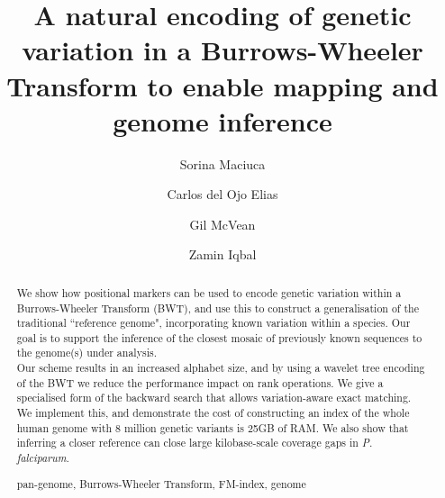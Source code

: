 \documentclass[runningheads,a4paper]{llncs}
\newcommand{\keywords}[1]{\par\addvspace\baselineskip
\noindent\keywordname\enspace\ignorespaces#1}
\begin{document}
\mainmatter  %

\title{A natural encoding of genetic variation in a Burrows-Wheeler Transform  to enable mapping and genome inference}


%
%
\author{Sorina Maciuca%
\and Carlos del Ojo Elias\and Gil McVean \and Zamin Iqbal}
%



\maketitle


\begin{abstract}
We show how positional markers can be used to encode genetic variation within a Burrows-Wheeler Transform (BWT), and use this to construct a generalisation of the traditional ``reference genome", incorporating known variation within a species. Our goal is to support the inference of the closest mosaic of previously known sequences to the genome(s) under analysis.\\ Our scheme results in an increased alphabet size, and by using a wavelet tree encoding of the BWT we reduce the performance impact on rank operations. We give a specialised form of the backward search that allows variation-aware exact matching. We implement this, and demonstrate the cost of constructing an index of the whole human genome with 8 million genetic variants is 25GB of RAM. We also show that inferring a closer reference can close large kilobase-scale coverage gaps in \textit{P. falciparum}.
\keywords{pan-genome, Burrows-Wheeler Transform, FM-index, genome}
\end{abstract}
\end{document}
